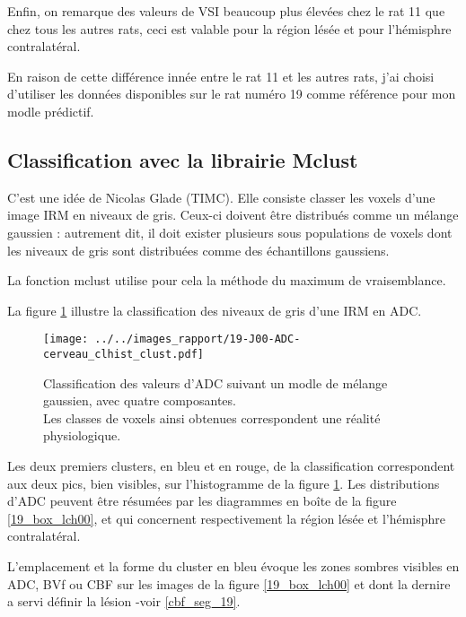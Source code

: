 \etoile
Enfin, on remarque des valeurs de VSI beaucoup plus \'elev\'ees chez le rat 11 que chez tous les autres rats, %
ceci est valable pour la r\'egion l\'es\'ee et pour l'h\'emisphre contralat\'eral.

\par
En raison de cette diff\'erence inn\'ee entre le rat 11 et les autres rats, %
j'ai choisi d'utiliser les donn\'ees disponibles sur le rat num\'ero 19 comme r\'ef\'erence pour mon modle pr\'edictif.

\FloatBarrier
\subsection{Classification avec la librairie Mclust}%

C'est une id\'ee de Nicolas Glade (TIMC). Elle consiste  classer les voxels d'une image IRM en niveaux de gris. %
Ceux-ci doivent \^etre distribu\'es comme un m\'elange gaussien : %
autrement dit, il doit exister plusieurs sous populations de voxels dont les niveaux de gris sont distribu\'ees comme des \'echantillons gaussiens.

\par
La fonction mclust utilise pour cela la m\'ethode du maximum de vraisemblance.

\par
La figure \ref{exem_ADC_19} illustre la classification des niveaux de gris d'une IRM en ADC.

\begin{figure}[H]
\texttt{[image: ../../images\_rapport/19-J00-ADC-cerveau\_clhist\_clust.pdf]}
\caption{Classification des valeurs d'ADC suivant un modle de m\'elange gaussien, avec quatre composantes.
\\
Les classes de voxels ainsi obtenues correspondent  une r\'ealit\'e physiologique.
}
\label{exem_ADC_19}
\end{figure}

\par
Les deux premiers clusters, en bleu et en rouge, de la classification correspondent aux deux pics, bien visibles, sur l'histogramme de la figure \ref{exem_ADC_19}. %
Les distributions d'ADC peuvent \^etre r\'esum\'ees par les diagrammes en bo\^ite de la figure \ref{19_box_lch00}, %
et qui concernent respectivement la r\'egion l\'es\'ee et l'h\'emisphre contralat\'eral.

\par
L'emplacement et la forme du cluster en bleu \'evoque les zones sombres visibles en ADC, BVf ou CBF sur les images de la figure \ref{19_box_lch00} %
et dont la dernire a servi  d\'efinir la l\'esion -voir \ref{cbf_seg_19}.

